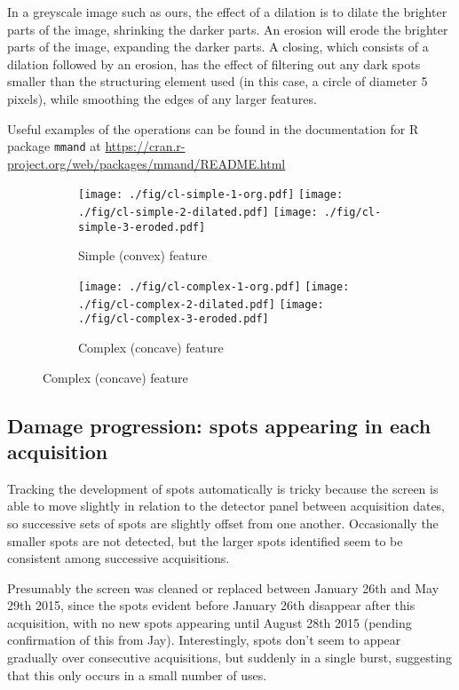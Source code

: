 \documentclass[10pt,fleqn]{article}
\begin{document}
In a greyscale image such as ours, the effect of a dilation is to dilate the brighter parts of the image, shrinking the darker parts. An erosion will erode the brighter parts of the image, expanding the darker parts. A closing, which consists of a dilation followed by an erosion, has the effect of filtering out any dark spots smaller than the structuring element used (in this case, a circle of diameter 5 pixels), while smoothing the edges of any larger features.

Useful examples of the operations can be found in the documentation for R package \texttt{mmand} at \url{https://cran.r-project.org/web/packages/mmand/README.html}

\begin{figure}[ht!]
\centering
\caption{Closing of features of differing complexity, showing changes to feature boundary after closing with structuring element $B$; the light blue hatched area is the new boundary at each step.}
%
\begin{subfigure}[b]{0.48\textwidth}
\caption{Simple (convex) feature}
\centering
\texttt{[image: ./fig/cl-simple-1-org.pdf]}
\texttt{[image: ./fig/cl-simple-2-dilated.pdf]}
\texttt{[image: ./fig/cl-simple-3-eroded.pdf]}
\end{subfigure}
%
\begin{subfigure}[b]{0.48\textwidth}
\caption{Complex (concave) feature}
\centering
\texttt{[image: ./fig/cl-complex-1-org.pdf]}
\texttt{[image: ./fig/cl-complex-2-dilated.pdf]}
\texttt{[image: ./fig/cl-complex-3-eroded.pdf]}
\end{subfigure}
\end{figure}


\FloatBarrier
\subsection*{Damage progression: spots appearing in each acquisition}
Tracking the development of spots automatically is tricky because the screen is able to move slightly in relation to the detector panel between acquisition dates, so successive sets of spots are slightly offset from one another. Occasionally the smaller spots are not detected, but the larger spots identified seem to be consistent among successive acquisitions. 

Presumably the screen was cleaned or replaced between January 26th and May 29th 2015, since the spots evident before January 26th disappear after this acquisition, with no new spots appearing until August 28th 2015 (pending confirmation of this from Jay). Interestingly, spots don't seem to appear gradually over consecutive acquisitions, but suddenly in a single burst, suggesting that this only occurs in a small number of uses.
\end{document}
